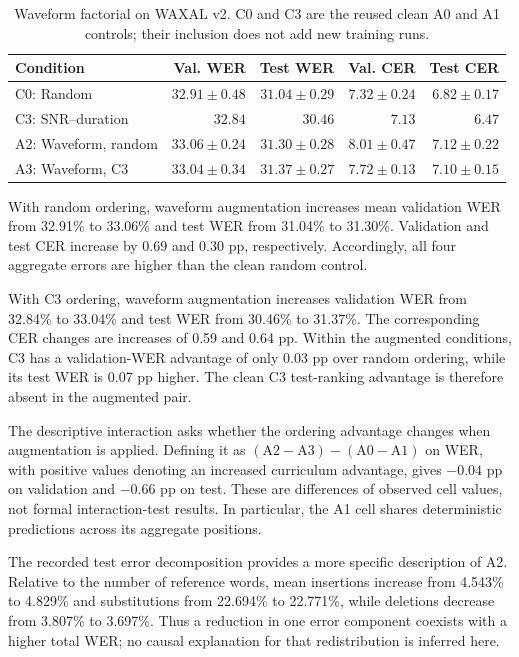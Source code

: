\documentclass[12pt,a4paper]{report}
\begin{document}
\begin{table}[htbp]\centering\scriptsize
\caption{Waveform factorial on WAXAL v2. C0 and C3 are the reused clean A0 and A1 controls; their inclusion does not add new training runs.}\label{tab:results-wave}
\setlength{\tabcolsep}{4pt}
\begin{tabular}{lrrrr}\toprule
Condition & Val. WER & Test WER & Val. CER & Test CER\\\midrule
C0: Random & $32.91 \pm 0.48$ & $31.04 \pm 0.29$ & $7.32 \pm 0.24$ & $6.82 \pm 0.17$ \\
C3: SNR--duration & $32.84$ & $30.46$ & $7.13$ & $6.47$ \\
A2: Waveform, random & $33.06 \pm 0.24$ & $31.30 \pm 0.28$ & $8.01 \pm 0.47$ & $7.12 \pm 0.22$ \\
A3: Waveform, C3 & $33.04 \pm 0.34$ & $31.37 \pm 0.27$ & $7.72 \pm 0.13$ & $7.10 \pm 0.15$ \\
\bottomrule\end{tabular}\end{table}

With random ordering, waveform augmentation increases mean validation WER from 32.91\% to 33.06\% and test WER from 31.04\% to 31.30\%. Validation and test CER increase by 0.69 and 0.30 pp, respectively. Accordingly, all four aggregate errors are higher than the clean random control.

With C3 ordering, waveform augmentation increases validation WER from 32.84\% to 33.04\% and test WER from 30.46\% to 31.37\%. The corresponding CER changes are increases of 0.59 and 0.64 pp. Within the augmented conditions, C3 has a validation-WER advantage of only 0.03 pp over random ordering, while its test WER is 0.07 pp higher. The clean C3 test-ranking advantage is therefore absent in the augmented pair.

The descriptive interaction asks whether the ordering advantage changes when augmentation is applied. Defining it as $(\mathrm{A2}-\mathrm{A3})-(\mathrm{A0}-\mathrm{A1})$ on WER, with positive values denoting an increased curriculum advantage, gives $-0.04$ pp on validation and $-0.66$ pp on test. These are differences of observed cell values, not formal interaction-test results. In particular, the A1 cell shares deterministic predictions across its aggregate positions.

The recorded test error decomposition provides a more specific description of A2. Relative to the number of reference words, mean insertions increase from 4.543\% to 4.829\% and substitutions from 22.694\% to 22.771\%, while deletions decrease from 3.807\% to 3.697\%. Thus a reduction in one error component coexists with a higher total WER; no causal explanation for that redistribution is inferred here.
\end{document}
